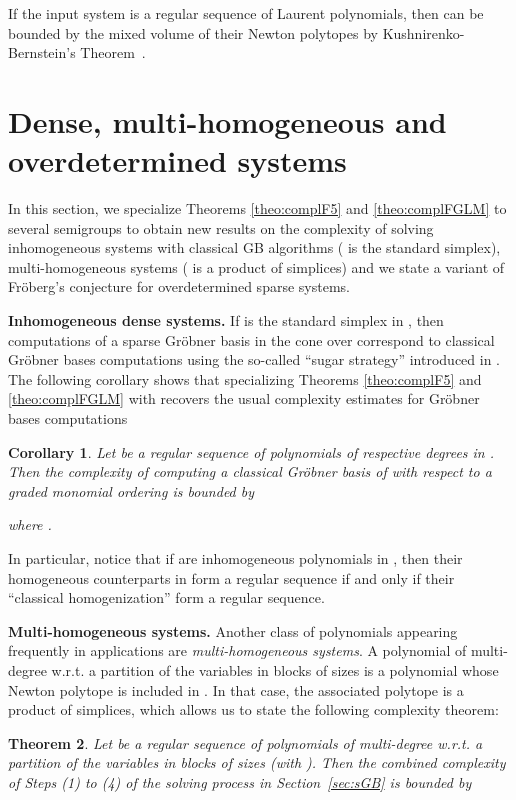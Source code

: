\documentclass[12pt]{article}
\numberwithin{equation}{section}
\newtheorem{theorem}{Theorem}
\numberwithin{theorem}{section}
\newtheorem{corollary}[theorem]{Corollary}
\begin{document}
If the input system is a regular sequence of Laurent polynomials, then
 can be bounded by the mixed volume of their Newton polytopes
by Kushnirenko-Bernstein's Theorem~\cite{bernshtein1975number}.


\section{Dense, multi-homogeneous and overdetermined systems}\label{sec:applis}
In this section, we specialize Theorems \ref{theo:complF5} and \ref{theo:complFGLM} to several semigroups to obtain new results on the complexity of solving inhomogeneous systems with classical GB algorithms ( is the standard simplex), multi-homogeneous systems ( is a product of simplices) and we state a variant of Fr\"oberg's conjecture for overdetermined sparse systems.

{\bf Inhomogeneous dense systems.}
If  is the standard simplex in , then
computations of a sparse Gr\"obner basis in the cone over 
correspond to classical Gr\"obner bases computations using the
so-called ``sugar strategy'' introduced in
\cite{giovini1991one}. The following corollary shows that specializing Theorems \ref{theo:complF5} and \ref{theo:complFGLM} with  recovers the usual complexity estimates for Gr\"obner bases computations
\begin{corollary}
  Let  be a regular sequence of
  polynomials of respective degrees  in . Then the complexity of computing a classical Gr\"obner basis
  of  with respect to a graded
  monomial ordering is bounded by 

where .
\end{corollary}
In particular, notice that if  are inhomogeneous
polynomials in , then their homogeneous counterparts in
 form a regular sequence if and only if their ``classical
homogenization'' form a regular sequence.

\smallskip

{\bf Multi-homogeneous systems.} Another class of polynomials appearing frequently in applications are \emph{multi-homo\-ge\-neous systems}. A polynomial of multi-degree  w.r.t. a partition of the variables in blocks of sizes  is a polynomial whose Newton polytope is included in . In that case, the associated polytope is a product of simplices, which allows us to state the following complexity theorem:

\begin{theorem}\label{theo:multihom}
Let  be a regular sequence of polynomials of multi-degree  w.r.t. a partition of the variables in blocks of sizes  (with ). Then the combined complexity of Steps (1) to (4) of the solving process in Section~\ref{sec:sGB} is bounded by

\end{theorem}
\end{document}
